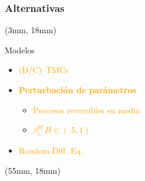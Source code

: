 \begin{frame}
    \frametitle{Alternativas}
    \begin{textblock*}{50mm}(3mm, 18mm)
        \begin{bluebox}{Modelos}
            \begin{itemize}
                \item
                    \textcolor<1>{orange}{(D/C)--TMCs}
                \item
                    \textcolor<2,3,4,5,7>{orange}{
                    \textbf<4-5,7>{%
                        Perturbación de parámetros
                    }
                }
                \begin{itemize}
                    \item
                        \textcolor<4>{orange}{
                            Procesos
                            reversibles
                            en media
                        }
                    \item
                        \textcolor<5>{orange}{
                            $
                                \beta_t^H \ H \in (\num{.5}, 1)
                            $
                        }
                \end{itemize}
                \item
                    \textcolor<6>{orange}{
                        Random Diff. Eq.
                    }
            \end{itemize}
        \end{bluebox}
    \end{textblock*}
   \begin{textblock*}{72mm}(55mm, 18mm)
       \begin{graybox}
            {%
}
\end{graybox}
\end{textblock*}
\end{frame}
